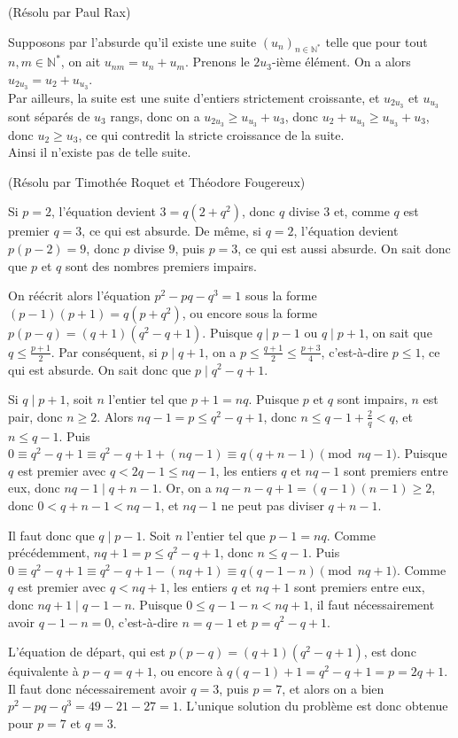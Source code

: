 \begin{sol}[78](Résolu par Paul Rax)

Supposons par l'absurde qu'il existe une suite $(u_n)_{n \in \mathbb{N}^*}$ telle que pour tout $n,m \in \mathbb{N}^*$, on ait
$u_{nm}=u_n+u_m$. Prenons le $2u_3$-i\`eme \'el\'ement. On a alors $u_{2u_3}=u_2+u_{u_3}$.\\
Par ailleurs, la suite est une suite d'entiers strictement croissante, et $u_{2u_3}$ et $u_{u_3}$ sont s\'epar\'es de $u_3$ rangs,
donc on a $u_{2u_3} \geq u_{u_3} +u_3$, donc $u_2+u_{u_3} \geq u_{u_3} +u_3$, donc $u_2 \geq u_3$, ce qui contredit la stricte croissance de la suite.\\
Ainsi il n'existe pas de telle suite.

\end{sol}

\begin{sol}[79](Résolu par Timothée Roquet et Théodore Fougereux)
 
Si $p = 2$, l'équation devient $3=q(2+q^2)$, donc $q$ divise $3$ et, comme $q$ est premier $q = 3$, ce qui est absurde.
De même, si $q = 2$, l'équation devient $p(p-2) = 9$, donc $p$ divise $9$, puis $p = 3$, ce qui est aussi absurde.
On sait donc que $p$ et $q$ sont des nombres premiers impairs.
 
On réécrit alors l'équation $p^2-pq-q^3=1$ sous la forme
$(p-1)(p+1) = q(p+q^2)$, ou encore sous la forme $p(p-q) = (q+1)(q^2-q+1)$.
Puisque $q \mid p-1$ ou $q \mid p+1$, on sait que $q \leq \frac{p+1}{2}$.
Par conséquent, si $p \mid q+1$, on a $p \leq \frac{q+1}{2} \leq \frac{p+3}{4}$, c'est-à-dire $p \leq 1$, ce qui est absurde.
On sait donc que $p \mid q^2-q+1$.

Si $q \mid p+1$, soit $n$ l'entier tel que $p+1 = nq$. Puisque $p$ et $q$ sont impairs, $n$ est pair, donc $n \geq 2$.
Alors $nq-1 = p \leq q^2-q+1$, donc $n \leq q-1 + \frac{2}{q} < q$,
et $n \leq q-1$. Puis $0 \equiv q^2-q+1 \equiv q^2-q+1+(nq-1) \equiv q(q+n-1) \pmod{nq-1}$.
Puisque $q$ est premier avec $q < 2q-1 \leq nq-1$, les entiers $q$ et $nq-1$ sont premiers entre eux, donc $nq-1 \mid q+n-1$.
Or, on a $nq - n - q + 1 = (q-1)(n-1) \geq 2$, donc
$0 < q+n-1 < nq-1$, et $nq-1$ ne peut pas diviser $q+n-1$.

Il faut donc que $q \mid p-1$. Soit $n$ l'entier tel que $p-1 = nq$. Comme précédemment, $nq+1 = p \leq q^2-q+1$, donc $n \leq q-1$.
Puis $0 \equiv q^2-q+1 \equiv q^2-q+1-(nq+1) \equiv q(q-1-n) \pmod{nq+1}$. Comme $q$ est premier avec $q < nq+1$,
les entiers $q$ et $nq+1$ sont premiers entre eux, donc $nq+1 \mid q-1-n$. Puisque $0 \leq q-1-n < nq+1$, il
faut nécessairement avoir $q-1-n = 0$, c'est-à-dire $n = q-1$ et $p = q^2-q+1$.

L'équation de départ, qui est $p(p-q) = (q+1)(q^2-q+1)$, est donc équivalente à $p-q = q+1$, ou encore à $q(q-1)+1 = q^2-q+1 = p = 2q+1$.
Il faut donc nécessairement avoir $q = 3$, puis $p = 7$, et alors on a bien $p^2-pq-q^3 = 49 - 21 - 27 = 1$.
L'unique solution du problème est donc obtenue pour $p = 7$ et $q = 3$.
\end{sol}

